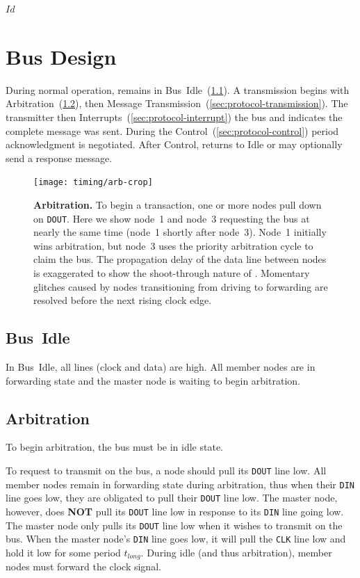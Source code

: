 \svnInfo $Id$

\section{Bus Design}
\label{sec:protocol}
During normal operation, \bus remains in Bus~Idle~(\ref{sec:protocol-idle}).
A transmission begins with Arbitration~(\ref{sec:protocol-arbitration}), then
Message Transmission~(\ref{sec:protocol-transmission}). The transmitter then
Interrupts~(\ref{sec:protocol-interrupt}) the bus and indicates the complete
message was sent. During the Control~(\ref{sec:protocol-control}) period
acknowledgment is negotiated. After Control, \bus returns to Idle or may
optionally send a response message.

\begin{figure}[h!]
  \centering
  \texttt{[image: timing/arb-crop]}
  \caption{\textbf{\bus Arbitration.} \textmd{
    To begin a transaction, one or more nodes pull down on {\tt DOUT}.
    Here we show node~1 and node~3 requesting the bus at nearly the same time
    (node~1 shortly after node~3). Node~1 initially wins arbitration, but
    node~3 uses the priority arbitration cycle to claim the bus. The
    propagation delay of the data line between nodes is exaggerated to show
    the shoot-through nature of \bus. Momentary glitches caused by nodes
    transitioning from driving to forwarding are resolved before the next
    rising clock edge.
  }}
  \label{fig:arbitration}
\end{figure}

\subsection{Bus~Idle}
\label{sec:protocol-idle}
In \bus Bus~Idle, all lines (clock and data) are high. All member nodes are in
forwarding state and the master node is waiting to begin arbitration.

\subsection{Arbitration}
\label{sec:protocol-arbitration}
To begin arbitration, the bus must be in idle state.

To request to transmit on the bus, a node should pull its {\tt DOUT} line low.
All member nodes remain in forwarding state during arbitration, thus when
their {\tt DIN} line goes low, they are obligated to pull their {\tt DOUT}
line low. The master node, however, does {\bf NOT} pull its {\tt DOUT} line
low in response to its {\tt DIN} line going low. The master node only pulls
its {\tt DOUT} line low when it wishes to transmit on the bus. When the
master node's {\tt DIN} line goes low, it will pull the {\tt CLK} line low
and hold it low for some period $t_{long}$. During {\sc idle} (and thus
arbitration), member nodes must forward the clock signal.

